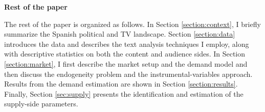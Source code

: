 \documentclass[12pt]{article}
\begin{document}

\textbf{Rest of the paper}

The rest of the paper is organized as follows. In Section \ref{section:context}, I briefly summarize the Spanish political and TV landscape. Section \ref{section:data} introduces the data and describes the text analysis techniques I employ, along with descriptive statistics on both the content and audience sides. In Section \ref{section:market}, I first describe the market setup and the demand model and then discuss the endogeneity problem and the instrumental-variables approach. Results from the demand estimation are shown in Section \ref{section:results}. Finally, Section \ref{sec:supply} presents the identification and estimation of the supply-side parameters.
\end{document}
